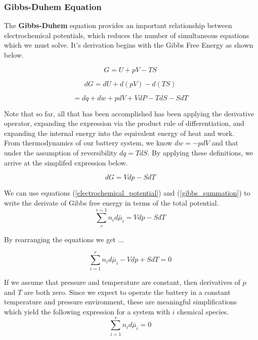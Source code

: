 \documentclass[lettersize,journal]{IEEEtran}
\begin{document}
\subsubsection{Gibbs-Duhem Equation}
The \textbf{Gibbs-Duhem} equation provides an important relationship between electrochemical potentials, which reduces the number of simultaneous equations which we must solve. It's derivation begins with the Gibbs Free Energy as shown below.

\begin{equation}
  G = U + pV - TS
\end{equation}

\begin{equation}
    dG = dU + d(pV) - d(TS)
\end{equation}

\begin{equation}
  = dq + dw + pdV + VdP -TdS - SdT
\end{equation}

\noindent Note that so far, all that has been accomplished has been applying the derivative operator, expanding the expression via the product rule of differentiation, and expanding the internal energy into the equivalent energy of heat and work.  \\

\noindent From thermodynamics of our battery system, we know $dw = -pdV$ and that under the assumption of reversibility $dq = TdS$. By applying these definitions, we arrive at the simplifed expression below.

\begin{equation}
  dG = Vdp - SdT
\end{equation}

We can use equations (\ref{electrochemical_potential}) and (\ref{gibbs_summation}) to write the derivate of Gibbs free energy in terms of the total potential.
\begin{equation}
  \sum_{r}^{i=1} n_id\bar{\mu}_i = Vdp - SdT
\end{equation}

\noindent By rearranging the equations we get ...

\begin{equation}
  \sum_{i=1}^{r} n_id\bar{\mu}_i - Vdp + SdT = 0
\end{equation}

\noindent If we assume that pressure and temperature are constant, then derivatives of $p$ and $T$ are both zero. Since we expect to operate the battery in a constant temperature and pressure environment, these are meaningful simplifications which yield the following expression for a system with $i$ chemical species.
\begin{equation}
  \sum_{i=1}^{r} n_id\bar{\mu}_i = 0
\end{equation}
\end{document}
